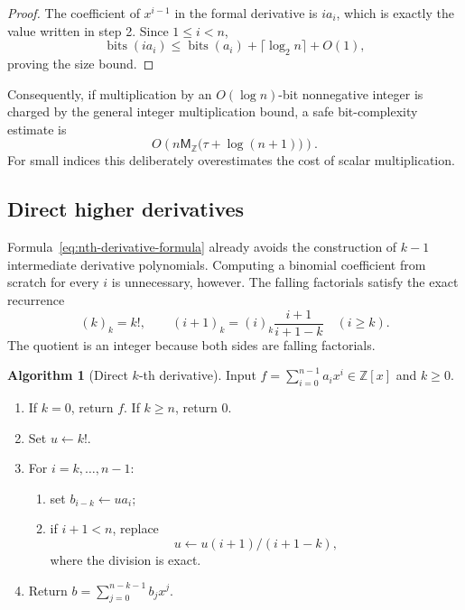 \documentclass[11pt]{book}
\theoremstyle{definition}
\newtheorem{algorithm}[theorem]{Algorithm}
\newcommand{\ZZ}{\mathbb Z}
\newcommand{\bits}{\operatorname{bits}}
\newcommand{\MZ}{\mathsf M_{\ZZ}}
\begin{document}
\begin{proof}
The coefficient of $x^{i-1}$ in the formal derivative is $ia_i$, which is
exactly the value written in step 2.  Since $1\le i<n$,
\[
 \bits(ia_i)\le \bits(a_i)+\lceil\log_2 n\rceil+O(1),
\]
proving the size bound.
\end{proof}

Consequently, if multiplication by an $O(\log n)$-bit nonnegative integer is
charged by the general integer multiplication bound, a safe bit-complexity
estimate is
\begin{equation}\label{eq:first-derivative-bit}
 O\left(n\MZ\bigl(\tau+\log(n+1)\bigr)\right).
\end{equation}
For small indices this deliberately overestimates the cost of scalar
multiplication.

\subsection{Direct higher derivatives}

Formula~\eqref{eq:nth-derivative-formula} already avoids the construction of
$k-1$ intermediate derivative polynomials.  Computing a binomial coefficient
from scratch for every $i$ is unnecessary, however.  The falling factorials
satisfy the exact recurrence
\begin{equation}\label{eq:falling-factorial-recurrence}
 (k)_k=k!,\qquad
 (i+1)_k=(i)_k\frac{i+1}{i+1-k}\quad(i\ge k).
\end{equation}
The quotient is an integer because both sides are falling factorials.

\begin{algorithm}[Direct $k$-th derivative]\label{alg:nth-derivative}
Input $f=\sum_{i=0}^{n-1}a_i x^i\in\ZZ[x]$ and $k\ge0$.
\begin{enumerate}
 \item If $k=0$, return $f$.  If $k\ge n$, return $0$.
 \item Set $u\leftarrow k!$.
 \item For $i=k,\ldots,n-1$:
 \begin{enumerate}
  \item set $b_{i-k}\leftarrow u a_i$;
  \item if $i+1<n$, replace
  \[
      u\leftarrow u(i+1)/(i+1-k),
  \]
  where the division is exact.
 \end{enumerate}
 \item Return $b=\sum_{j=0}^{n-k-1}b_jx^j$.
\end{enumerate}
\end{algorithm}
\end{document}
